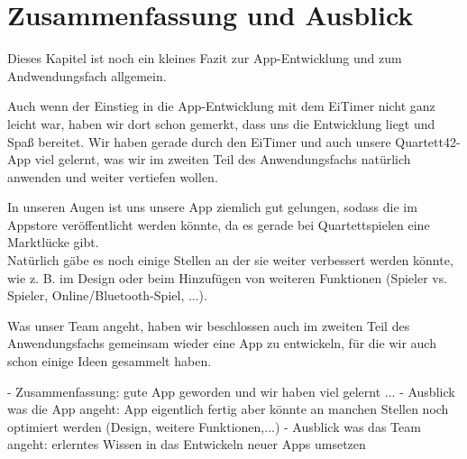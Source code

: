 \chapter{Zusammenfassung und Ausblick}
\label{cha:zusammenfassungUndAusblick}

Dieses Kapitel ist noch ein kleines Fazit zur App-Entwicklung und zum Andwendungsfach allgemein. 

Auch wenn der Einstieg in die App-Entwicklung mit dem EiTimer nicht ganz leicht war, haben wir dort schon gemerkt, dass uns die Entwicklung liegt und Spaß bereitet. Wir haben gerade durch den EiTimer und auch unsere Quartett42-App viel gelernt, was wir im zweiten Teil des Anwendungsfachs natürlich anwenden und weiter vertiefen wollen. 

In unseren Augen ist uns unsere App ziemlich gut gelungen, sodass die im Appstore veröffentlicht werden könnte, da es gerade bei Quartettspielen eine Marktlücke gibt.\\ Natürlich gäbe es noch einige Stellen an der sie weiter verbessert werden könnte, wie z. B. im Design oder beim Hinzufügen von weiteren Funktionen (Spieler vs. Spieler, Online/Bluetooth-Spiel, ...).

Was unser Team angeht, haben wir beschlossen auch im zweiten Teil des Anwendungsfachs gemeinsam wieder eine App zu entwickeln, für die wir auch schon einige Ideen gesammelt haben. 


- Zusammenfassung: gute App geworden und wir haben viel gelernt ...
- Ausblick was die App angeht: App eigentlich fertig aber könnte an manchen Stellen noch optimiert werden (Design, weitere Funktionen,...)
- Ausblick was das Team angeht: erlerntes Wissen in das Entwickeln neuer Apps umsetzen